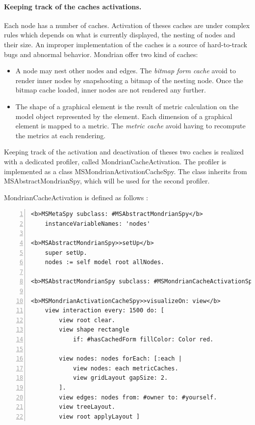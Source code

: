\documentclass[runningheads]{llncs}
\newcommand{\lr}[1]{\nb{Lukas}{orange}{#1}}
\newcommand{\co}[1]{{\sf #1}}
\begin{document}
\paragraph{Keeping track of the caches activations.}
Each node has a number of caches. Activation of theses caches are under complex rules which depends on what is currently displayed, the nesting of nodes and their size. An improper implementation of the caches is a source of hard-to-track bugs and abnormal behavior. Mondrian offer two kind of caches:
\begin{itemize}
\item A node may nest other nodes and edges. The \emph{bitmap form cache} avoid to render inner nodes by snapshooting a bitmap of the nesting node. Once the bitmap cache loaded, inner nodes are not rendered any further.
\item The shape of a graphical element is the result of metric calculation on the model object represented by the element. Each dimension of a graphical element is mapped to a metric. The \emph{metric cache} avoid having to recompute the metrics at each rendering.
\end{itemize}

Keeping track of the activation and deactivation of theses two caches is realized with a dedicated profiler, called {\sc MondrianCacheActivation}. The profiler is implemented as a class \co{MSMondrianActivationCacheSpy}. The class inherits from \co{MSAbstractMondrianSpy}, which will be used for the second profiler.

{\sc MondrianCacheActivation} is defined as follows \lr{what does this demonstrate?}:

\begin{lstlisting}[numbers=left]
<b>MSMetaSpy subclass: #MSAbstractMondrianSpy</b>
	instanceVariableNames: 'nodes'
	
<b>MSAbstractMondrianSpy>>setUp</b>
	super setUp.
	nodes := self model root allNodes.
	
<b>MSAbstractMondrianSpy subclass: #MSMondrianCacheActivationSpy</b>

<b>MSMondrianActivationCacheSpy>>visualizeOn: view</b>
	view interaction every: 1500 do: [
		view root clear.
		view shape rectangle
			if: #hasCachedForm fillColor: Color red.

		view nodes: nodes forEach: [:each |
			view nodes: each metricCaches.
			view gridLayout gapSize: 2.
		].  
		view edges: nodes from: #owner to: #yourself.
		view treeLayout.
		view root applyLayout ]
\end{lstlisting}
\end{document}
